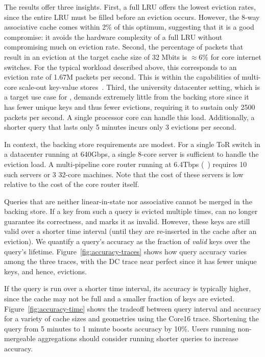 The results offer three insights. First, a full LRU offers the lowest eviction
rates, since the entire LRU must be filled before an eviction occurs. However,
the 8-way associative cache comes within 2\% of this optimum, suggesting that it
is a good compromise: it avoids the hardware complexity of a full LRU without
compromising much on eviction rate. 
Second, the percentage of packets that result in an eviction at the target cache size of 32 Mbits is $\approx6\%$ for core internet switches. For the typical workload described above, this corresponds to an eviction rate of 1.67M packets per second. This is within the capabilities of multi-core scale-out key-value stores~\cite{redis_benchmark, memcached_benchmark, redis_vs_memcached, redis_vs_memcached_update}.
Third, the university datacenter setting, which is a target use case for \TheSystem,
demands extremely little from the backing store since it has fewer unique keys
and thus fewer evictions, requiring it to sustain only 2500 packets per
second. A single processor core can handle this load. Additionally, a shorter
query that lasts only 5 minutes incurs only 3 evictions per second.

In context, the backing store requirements are modest. For a single ToR switch in a datacenter running at 640Gbps, a single 8-core server is sufficient to handle the eviction load. A multi-pipeline core router running at 6.4Tbps (\eg~\cite{tofino}) requires 10 such servers or 3 32-core machines. Note that the cost of these servers is low relative to the cost of the core router itself.

Queries that are neither linear-in-state nor associative cannot be merged in the
backing store. If a key from such a query is evicted multiple times, \TheSystem
can no longer guarantee its correctness, and marks it as invalid. However, these
keys are still valid over a shorter time interval (until they are re-inserted in the
cache after an eviction). We quantify a query's accuracy as the fraction
of \emph{valid} keys over the query's lifetime. Figure~\ref{fig:accuracy-traces}
shows how query accuracy varies among the three traces, with the DC trace
near perfect since it has fewer unique keys, and hence, evictions.

If the query is run over a shorter time interval, its accuracy is typically higher, since the cache may not be full and a smaller fraction of keys are evicted. 
Figure~\ref{fig:accuracy-time} shows the tradeoff between query interval and accuracy for a variety of cache sizes and geometries using the Core16 trace.
Shortening the query from 5 minutes to 1 minute boosts accuracy by 10\%. Users running non-mergeable aggregations should consider running shorter queries to increase accuracy.

